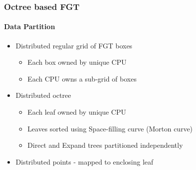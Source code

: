 \begin{frame}
\frametitle{Octree based FGT}
\framesubtitle{Data Partition}
\begin{itemize}
\item Distributed regular grid of FGT boxes
\begin{itemize}
\item Each box owned by unique CPU
\item Each CPU owns a sub-grid of boxes
\newline
\end{itemize}
\item Distributed octree
\begin{itemize}
\item Each leaf owned by unique CPU
\item Leaves sorted using Space-filling curve (Morton curve)
\item Direct and Expand trees partitioned independently
\newline
\end{itemize}
\item Distributed points - mapped to enclosing leaf
\end{itemize}
\end{frame}

